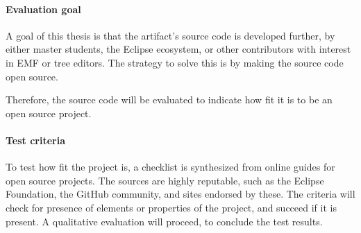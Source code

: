 \paragraph{Evaluation goal}
A goal of this thesis is that the artifact's source code is developed further, by either master students, the Eclipse ecosystem, or other contributors with interest in \acrshort{EMF} or tree editors.
The strategy to solve this is by making the source code \gls{open source}.


Therefore, the source code will be evaluated to indicate how fit it is to be an \gls{open source} project.


\paragraph{Test criteria}
To test how fit the project is, a checklist is synthesized from online guides for open source projects.
The sources are highly reputable, such as the Eclipse Foundation, the GitHub community, and sites endorsed by these.
The criteria will check for presence of elements or properties of the project, and succeed if it is present.
A qualitative evaluation will proceed, to conclude the test results.
